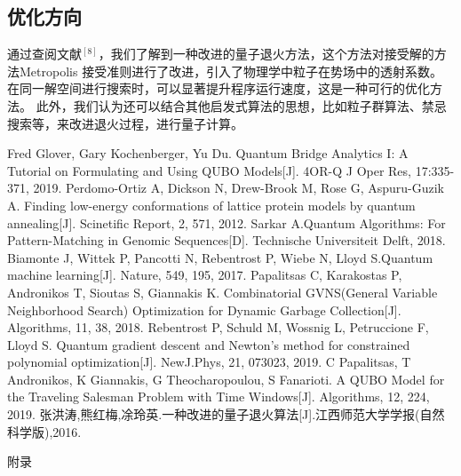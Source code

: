 \documentclass{MathorCupmodeling}
\begin{document}
       \subsection{优化方向}
       通过查阅文献$^{[8]}$，我们了解到一种改进的量子退火方法，这个方法对接受解的方法Metropolis 接受准则进行了改进，引入了物理学中粒子在势场中的透射系数。在同一解空间进行搜索时，可以显著提升程序运行速度，这是一种可行的优化方法。
       此外，我们认为还可以结合其他启发式算法的思想，比如粒子群算法、禁忌搜索等，来改进退火过程，进行量子计算。
	\begin{thebibliography}{99}
	Fred Glover, Gary Kochenberger, Yu Du. Quantum Bridge Analytics I: A Tutorial on Formulating and Using QUBO Models[J]. 4OR-Q J Oper Res, 17:335-371, 2019.
 Perdomo-Ortiz A, Dickson N, Drew-Brook M, Rose G, Aspuru-Guzik A. Finding low-energy conformations of lattice protein models by quantum annealing[J]. Scinetific Report, 2, 571, 2012.
  Sarkar A.Quantum Algorithms: For Pattern-Matching in Genomic Sequences[D]. Technische Universiteit Delft, 2018.
 Biamonte J, Wittek P, Pancotti N, Rebentrost P, Wiebe N, Lloyd S.Quantum machine learning[J]. Nature, 549, 195, 2017.
 Papalitsas C, Karakostas P, Andronikos T, Sioutas S, Giannakis K. Combinatorial GVNS(General 
Variable Neighborhood Search) Optimization for Dynamic Garbage Collection[J]. Algorithms, 11, 38, 2018.
 Rebentrost P, Schuld M, Wossnig L, Petruccione F, Lloyd S. Quantum gradient descent and Newton’s method for constrained polynomial optimization[J]. NewJ.Phys, 21, 073023, 2019.
  C Papalitsas, T Andronikos, K Giannakis, G Theocharopoulou, S Fanarioti. A QUBO Model for the Traveling Salesman Problem with Time Windows[J]. Algorithms, 12, 224, 2019.
  张洪涛,熊红梅,凃玲英.一种改进的量子退火算法[J].江西师范大学学报(自然科学版),2016.
	\end{thebibliography}

	\newpage
	\appendix
	\begin{center}
		\heiti{} 附\hspace{1pc}录
	\end{center}
\end{document}
